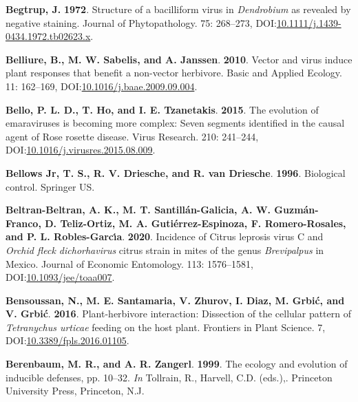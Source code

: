 \documentclass[12pt,final,CPage]{ufthesis}
\newlength{\cslhangindent}
\newenvironment{CSLReferences}[2] %
{%
	\setlength{\parindent}{0pt}
	\ifodd #1 \everypar{\setlength{\hangindent}{\cslhangindent}}\ignorespaces\fi
	\ifnum #2 > 0
	\setlength{\parskip}{#2\baselineskip}
	\fi
}%
{}
\begin{document}
{\begin{CSLReferences}{1}{0}
  \leavevmode{}%
  \textbf{Begtrup, J.} \textbf{1972}. Structure of a bacilliform virus in {\emph{Dendrobium}} as revealed by negative staining. Journal of Phytopathology. 75: 268--273, DOI:\href{https://doi.org/10.1111/j.1439-0434.1972.tb02623.x}{10.1111/j.1439-0434.1972.tb02623.x}.

  \leavevmode{}%
  \textbf{Belliure, B., M. W. Sabelis, and A. Janssen}. \textbf{2010}. Vector and virus induce plant responses that benefit a non-vector herbivore. Basic and Applied Ecology. 11: 162--169, DOI:\href{https://doi.org/10.1016/j.baae.2009.09.004}{10.1016/j.baae.2009.09.004}.

  \leavevmode{}%
  \textbf{Bello, P. L. D., T. Ho, and I. E. Tzanetakis}. \textbf{2015}. The evolution of emaraviruses is becoming more complex: Seven segments identified in the causal agent of {Rose rosette disease}. Virus Research. 210: 241--244, DOI:\href{https://doi.org/10.1016/j.virusres.2015.08.009}{10.1016/j.virusres.2015.08.009}.

  \leavevmode{}%
  \textbf{Bellows Jr, T. S., R. V. Driesche, and R. van Driesche}. \textbf{1996}. Biological control. Springer US.

  \leavevmode{}%
  \textbf{Beltran-Beltran, A. K., M. T. Santillán-Galicia, A. W. Guzmán-Franco, D. Teliz-Ortiz, M. A. Gutiérrez-Espinoza, F. Romero-Rosales, and P. L. Robles-Garcı́a}. \textbf{2020}. Incidence of {Citrus leprosis virus} {C} and {\emph{Orchid fleck dichorhavirus}} citrus strain in mites of the genus {\emph{Brevipalpus}} in {Mexico}. Journal of Economic Entomology. 113: 1576--1581, DOI:\href{https://doi.org/10.1093/jee/toaa007}{10.1093/jee/toaa007}.

  \leavevmode{}%
  \textbf{Bensoussan, N., M. E. Santamaria, V. Zhurov, I. Diaz, M. Grbić, and V. Grbić}. \textbf{2016}. Plant-herbivore interaction: Dissection of the cellular pattern of {\emph{Tetranychus urticae}} feeding on the host plant. Frontiers in Plant Science. 7, DOI:\href{https://doi.org/10.3389/fpls.2016.01105}{10.3389/fpls.2016.01105}.

  \leavevmode{}%
  \textbf{Berenbaum, M. R., and A. R. Zangerl}. \textbf{1999}. The ecology and evolution of inducible defenses, pp. 10--32. \emph{In} Tollrain, R., Harvell, C.D. (eds.),. Princeton University Press, Princeton, N.J.


\end{CSLReferences}}
\end{document}
